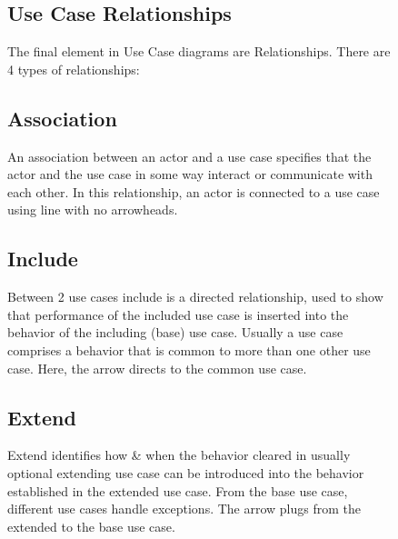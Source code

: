 \begin{figure}

\subsection*{Use Case Relationships}

\noindent The final element in Use Case diagrams are Relationships. There are 4 types of relationships:

\noindent 
\subsection{Association}

\noindent An association between an actor and a use case specifies that the actor and the use case in some way interact or communicate with each other. In this relationship, an actor is connected to a use case using line with no arrowheads.


\noindent 
\subsection{Include}

\noindent Between 2 use cases include is a directed relationship, used to show that performance of the included use case is inserted into the behavior of the including (base) use case. Usually a use case comprises a behavior that is common to more than one other use case. Here, the arrow directs to the common use case.


\subsection{Extend}

\noindent Extend identifies how \& when the behavior cleared in usually optional extending use case can be introduced into the behavior established in the extended use case. From the base use case, different use cases handle exceptions. The arrow plugs from the extended to the base use case.\textbf{}
\end{figure}
